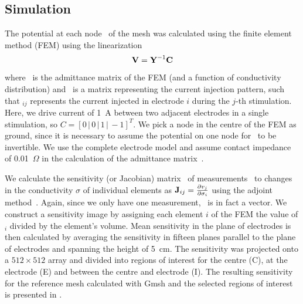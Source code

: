 \subsection{Simulation}
The potential at each node \VB\ of the mesh was calculated using the finite
element method (FEM) using the linearization 
\begin{equation}
{\mbox{\bf V}} = {\mbox{\bf Y}}^{-1}{\mbox{\bf C}}
\end{equation}
where \YB\ is the admittance matrix of the FEM (and a function of conductivity
distribution) and \CB\ is a matrix representing the current injection pattern,
such that \CB$_{ij}$ represents the current injected in electrode $i$ during
the $j$-th stimulation. Here, we drive current of 1~A between two adjacent
electrodes in a single stimulation, so $C = [0\,|\,0\,|\,1\,|\,-1]^T$. 
We pick a node in the centre of the FEM as ground, since it is necessary to
assume the potential on
one node for \YB\ to be invertible.
We use the complete electrode model and assume contact impedance of
0.01~$\Omega$ in the calculation of the admittance
matrix~\parencite{polydorides_electrode_2002}. 


We calculate the sensitivity (or Jacobian) matrix \JB\ of measurements \vB\ to
changes in the conductivity $\sigma$ of individual elements as
${\mbox{\bf J}}_{ij}=\frac{\partial v_j}{\partial \sigma_i}$ using the adjoint
method~\parencite{polydorides_electrode_2002}. Again, since we only have one measurement, \JB\
is in fact a vector.
We construct a sensitivity image by assigning each element
$i$ of the FEM the value of \JB$_i$ divided by the element's volume.
Mean sensitivity in the plane of electrodes is then calculated by averaging
the sensitivity in fifteen planes parallel to the plane of electrodes and
spanning the height of 5~cm. 
The sensitivity was projected onto a $512\times512$ array and divided into regions
of interest for the centre (C), at the electrode (E) and between the centre and electrode
(I). The resulting sensitivity for the reference mesh calculated with Gmsh and the 
selected regions of interest is presented in \fref{fig:roiMethods}.



